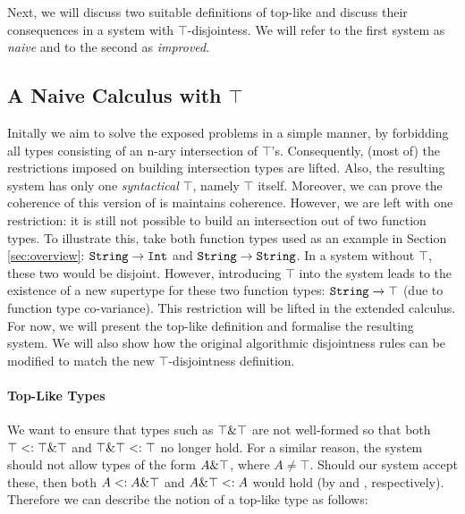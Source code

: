 Next, we will discuss two suitable definitions of top-like and discuss their consequences in a system with
$\top$-disjointess.
We will refer to the first system as \emph{naive} and to the second as \emph{improved}. 

\subsection{A Naive Calculus with $\top$}

Initally we aim to solve the exposed problems in a simple manner,  
by forbidding all types consisting of an n-ary intersection of $\top$'s.
Consequently, (most of) the restrictions imposed on building intersection types are lifted.
Also, the resulting system has only one \emph{syntactical} $\top$, namely $\top$ itself.
Moreover, we can prove the coherence of this version of \name is maintains coherence.
However, we are left with one restriction: it is still not possible to build an intersection out of two function types.
To illustrate this, take both function types used as an example in Section \ref{sec:overview}: 
$\texttt{String} \to \texttt{Int}$ and $\texttt{String} \to \texttt{String}$. 
In a system without $\top$, these two would be disjoint. 
However, introducing $\top$ into the system leads to the existence of a new supertype for these 
two function types: $\texttt{String} \to \top$ (due to function type co-variance). 
This restriction will be lifted in the extended calculus.
For now, we will present the top-like definition and formalise the resulting system. 
We will also show how the original algorithmic disjointness rules can be modified to match the new $\top$-disjointness
definition.


\paragraph{Top-Like Types}

We want to ensure that types such as $\top \& \top$ are not well-formed so that both 
$\top <: \top \& \top$ and $\top \& \top <: \top$ no longer hold.
For a similar reason, the system should not allow types of the form $A \& \top$, where $A \neq \top$.  
Should our system accept these, then both $A <: A \& \top$ and 
$A \& \top <: A$ would hold (by  and , respectively).
Therefore we can describe the notion of a top-like type as follows: 

